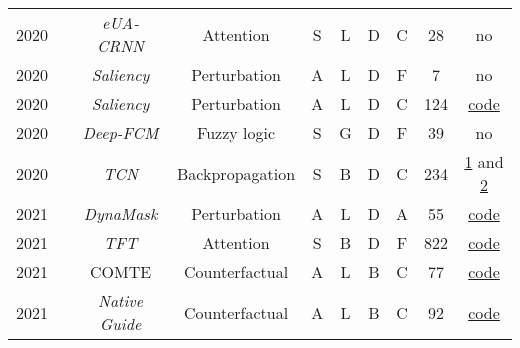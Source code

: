 \begin{table*}[H]
\begin{tabular}{@{}cccccccccc@{}}
    2020        & \cite{tan_explainable_2021}                 &\textit{\footnotesize{eUA-CRNN}}  & Attention     &S       & L         & D      & C                                & 28                & no\\  

    2020        & \cite{pan_series_2020}           &\textit{Saliency}& Perturbation    &A       & L         & D      & F                       & 7                 & no \\ 

    2020        & \cite{ismail_benchmarking_2020}           &\textit{Saliency}& Perturbation    &A       & L         & D      & C                    & 124               & \href{https://github.com/ayaabdelsalam91/TS-Interpretability-Benchmark}{code}\\ 

    2020        & \cite{wang_deep_2021}           & \textit{\footnotesize{Deep-FCM}}& Fuzzy logic    &S       & G        & D      & F                        & 39                & no\\ 

    2020        & \cite{lauritsen_early_2020}   &\textit{TCN}       &Backpropagation      &S       & B          & D      & C                    & 234               & \href{https://github.com/albermax/innvestigate}{1} and \href{https://github.com/slundberg/shap}{2} \\

    2021        &\cite{crabbe_explaining_2021}    & \textit{DynaMask}     & Perturbation  & A      & L     & D      & A                    & 55            & \href{https://github.com/JonathanCrabbe/Dynamask}{code}   \\ 

    2021        & \cite{lim_temporal_2020}         & \textit{TFT}      & Attention     &S       & B          & D      & F                       & 822               & \href{https://github.com/greatwhiz/tft_tf2}{code}       \\ 

    2021    & \cite{ates_counterfactual_2021}   & COMTE                & Counterfactual    & A & L & B & C & 77 & \href{https://github.com/peaclab/CoMTE}{code} \\

    2021        & \cite{delaney_instance-based_2021} & \textit{\footnotesize{Native Guide}} & Counterfactual & A & L & B      & C & 92 & \href{https://github.com/e-delaney/Instance-Based_CFE_TSC/tree/main}{code} \\
  

\end{tabular}
\end{table*}
